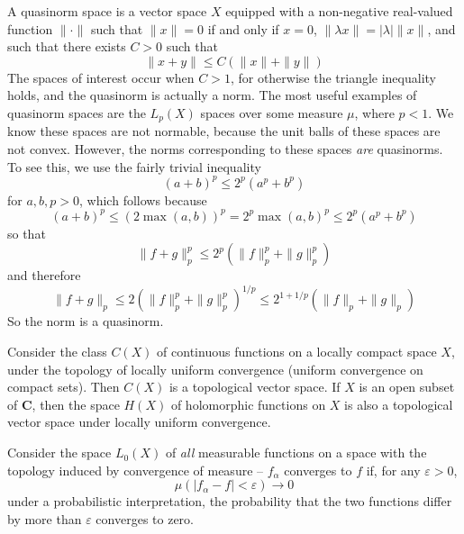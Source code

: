 \begin{example}
    A quasinorm space is a vector space $X$ equipped with a non-negative real-valued function $\| \cdot \|$ such that $\| x \| = 0$ if and only if $x = 0$, $\| \lambda x \| = |\lambda| \| x \|$, and such that there exists $C > 0$ such that
    \[ \| x + y \| \leq C (\|x\| + \|y\|) \]
    The spaces of interest occur when $C > 1$, for otherwise the triangle inequality holds, and the quasinorm is actually a norm. The most useful examples of quasinorm spaces are the $L_p(X)$ spaces over some measure $\mu$, where $p < 1$. We know these spaces are not normable, because the unit balls of these spaces are not convex. However, the norms corresponding to these spaces {\it are} quasinorms. To see this, we use the fairly trivial inequality
    \[ (a + b)^p \leq 2^p(a^p + b^p) \]
    for $a,b, p > 0$, which follows because
    \[ (a + b)^p \leq (2 \max(a,b))^p = 2^p \max(a,b)^p \leq 2^p(a^p + b^p) \]
    so that
    \[ \| f + g \|_p^p \leq 2^p ( \| f \|_p^p + \| g \|_p^p ) \]
    and therefore
    \[ \| f + g \|_p \leq 2 ( \| f \|_p^p + \| g \|_p^p )^{1/p} \leq 2^{1 + 1/p} ( \| f \|_p + \| g \|_p ) \]
    So the norm is a quasinorm.
\end{example}

\begin{example}
    Consider the class $C(X)$ of continuous functions on a locally compact space $X$, under the topology of locally uniform convergence (uniform convergence on compact sets). Then $C(X)$ is a topological vector space. If $X$ is an open subset of $\mathbf{C}$, then the space $H(X)$ of holomorphic functions on $X$ is also a topological vector space under locally uniform convergence.
\end{example}

\begin{example}
    Consider the space $L_0(X)$ of {\it all} measurable functions on a space with the topology induced by convergence of measure -- $f_\alpha$ converges to $f$ if, for any $\varepsilon > 0$,
    \[ \mu ( |f_\alpha - f| < \varepsilon ) \to 0 \]
    under a probabilistic interpretation, the probability that the two functions differ by more than $\varepsilon$ converges to zero.
\end{example}

